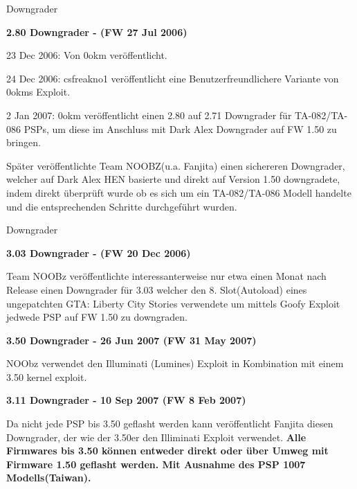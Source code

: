 \documentclass[mode=print,paper=screen,size=10pt,style=paintings]{powerdot}
\begin{document}
\begin{slide}{Downgrader}
	\begin{large}\textbf{2.80 Downgrader - (FW 27 Jul 2006)}\end{large}
	\begin{list}{-}{}
		\item{23 Dec 2006: Von 0okm veröffentlicht. }
		\item{24 Dec 2006: csfreakno1 veröffentlicht eine Benutzerfreundlichere Variante von 0okms Exploit.}
		\item{2 Jan 2007: 0okm veröffentlicht einen 2.80 auf 2.71 Downgrader für TA-082/TA-086 PSPs, um diese im Anschluss mit
			Dark Alex Downgrader auf FW 1.50 zu bringen.}
		\item{Später veröffentlichte Team NOOBZ(u.a. Fanjita) einen sichereren Downgrader, welcher auf Dark Alex HEN basierte
			und direkt auf Version 1.50 downgradete, indem direkt überprüft wurde ob es sich um ein TA-082/TA-086 Modell
			handelte und die entsprechenden Schritte durchgeführt wurden.}
	\end{list}
\end{slide}

\begin{slide}{Downgrader}
	\begin{large}\textbf{3.03 Downgrader - (FW 20 Dec 2006)}\end{large}\linebreak
	Team NOOBz veröffentlichte interessanterweise nur etwa einen Monat nach Release einen Downgrader für 3.03 welcher den 8.
	Slot(Autoload) eines ungepatchten GTA: Liberty City Stories verwendete um mittels Goofy Exploit jedwede PSP auf FW 1.50
	zu downgraden.\linebreak
	\linebreak
	\begin{large}\textbf{3.50 Downgrader - 26 Jun 2007 (FW 31 May 2007)}\end{large}\linebreak
	NOObz verwendet den Illuminati (Lumines) Exploit in Kombination mit einem 3.50 kernel exploit.\linebreak
	\linebreak
	\begin{large}\textbf{3.11 Downgrader - 10 Sep 2007 (FW 8 Feb 2007)}\end{large}\linebreak
	Da nicht jede PSP bis 3.50 geflasht werden kann veröffentlicht Fanjita diesen Downgrader, der wie der 3.50er den Illiminati
	Exploit verwendet.\linebreak
	\linebreak
	\textbf{Alle Firmwares bis 3.50 können entweder direkt oder über Umweg mit Firmware 1.50 geflasht werden. Mit Ausnahme
	des PSP 1007 Modells(Taiwan).} 
\end{slide}
\end{document}
